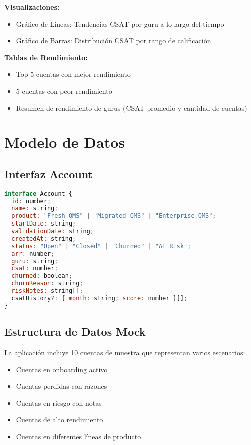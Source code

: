 \documentclass[12pt,a4paper]{article}
\begin{document}
\textbf{Visualizaciones:}
\begin{itemize}
    \item Gráfico de Líneas: Tendencias CSAT por guru a lo largo del tiempo
    \item Gráfico de Barras: Distribución CSAT por rango de calificación
\end{itemize}

\textbf{Tablas de Rendimiento:}
\begin{itemize}
    \item Top 5 cuentas con mejor rendimiento
    \item 5 cuentas con peor rendimiento
    \item Resumen de rendimiento de gurus (CSAT promedio y cantidad de cuentas)
\end{itemize}

\section{Modelo de Datos}

\subsection{Interfaz Account}

\begin{lstlisting}[language=JavaScript, caption=Estructura de Datos de Cuenta]
interface Account {
  id: number;
  name: string;
  product: "Fresh QMS" | "Migrated QMS" | "Enterprise QMS";
  startDate: string;
  validationDate: string;
  createdAt: string;
  status: "Open" | "Closed" | "Churned" | "At Risk";
  arr: number;
  guru: string;
  csat: number;
  churned: boolean;
  churnReason: string;
  riskNotes: string[];
  csatHistory?: { month: string; score: number }[];
}
\end{lstlisting}

\subsection{Estructura de Datos Mock}

La aplicación incluye 10 cuentas de muestra que representan varios escenarios:
\begin{itemize}
    \item Cuentas en onboarding activo
    \item Cuentas perdidas con razones
    \item Cuentas en riesgo con notas
    \item Cuentas de alto rendimiento
    \item Cuentas en diferentes líneas de producto
\end{itemize}
\end{document}
